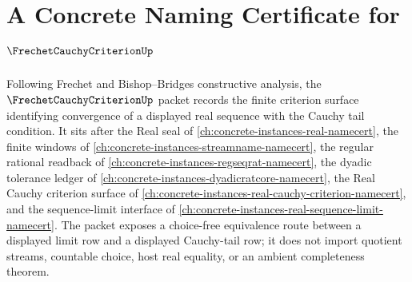 \chapter{A Concrete Naming Certificate for $\FrechetCauchyCriterionUp$}
\label{ch:concrete-instances-frechet-cauchy-criterion-namecert}

Following Frechet and Bishop--Bridges constructive analysis, the $\FrechetCauchyCriterionUp$ packet records the finite criterion surface identifying convergence of a displayed real sequence with the Cauchy tail condition. It sits after the Real seal of \autoref{ch:concrete-instances-real-namecert}, the finite windows of \autoref{ch:concrete-instances-streamname-namecert}, the regular rational readback of \autoref{ch:concrete-instances-regseqrat-namecert}, the dyadic tolerance ledger of \autoref{ch:concrete-instances-dyadicratcore-namecert}, the Real Cauchy criterion surface of \autoref{ch:concrete-instances-real-cauchy-criterion-namecert}, and the sequence-limit interface of \autoref{ch:concrete-instances-real-sequence-limit-namecert}. The packet exposes a choice-free equivalence route between a displayed limit row and a displayed Cauchy-tail row; it does not import quotient streams, countable choice, host real equality, or an ambient completeness theorem.

